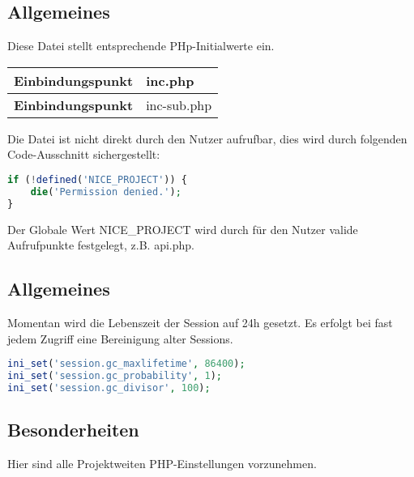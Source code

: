 \subsection{Allgemeines} Diese Datei stellt entsprechende PHp-Initialwerte ein.
\begin{table}[H]
	\begin{tabular}{|c|p{11cm}|}
		\hline
		\textbf{Einbindungspunkt} & inc.php \\ \hline
		\textbf{Einbindungspunkt} & inc-sub.php \\ \hline
	\end{tabular}
\end{table}
Die Datei ist nicht direkt durch den Nutzer aufrufbar, dies wird durch folgenden Code-Ausschnitt sichergestellt:
\begin{lstlisting}[language=php]
if (!defined('NICE_PROJECT')) {
	die('Permission denied.');
}
\end{lstlisting}
Der Globale Wert {\glqq NICE\_PROJECT\grqq} wird durch für den Nutzer valide Aufrufpunkte festgelegt, z.B. {\glqq api.php\grqq}.
\subsection{Allgemeines}
Momentan wird die Lebenszeit der Session auf 24h gesetzt. Es erfolgt bei fast jedem Zugriff eine Bereinigung alter Sessions.
\begin{lstlisting}[language=php]
ini_set('session.gc_maxlifetime', 86400);
ini_set('session.gc_probability', 1);
ini_set('session.gc_divisor', 100);
\end{lstlisting}
\subsection{Besonderheiten}
Hier sind alle Projektweiten PHP-Einstellungen vorzunehmen.
